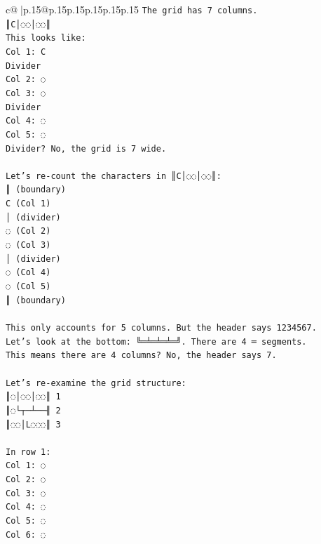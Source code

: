 \documentclass{article}
\begin{document}
{\begin{supertabular}{c@{$\;$}|p{.15\linewidth}@{}p{.15\linewidth}p{.15\linewidth}p{.15\linewidth}p{.15\linewidth}p{.15\linewidth}}
{{{\texttt{The grid has 7 columns.} \\
\texttt{║C│◌◌│◌◌║} \\
\texttt{This looks like:} \\
\texttt{Col 1: C} \\
\texttt{Divider} \\
\texttt{Col 2: ◌} \\
\texttt{Col 3: ◌} \\
\texttt{Divider} \\
\texttt{Col 4: ◌} \\
\texttt{Col 5: ◌} \\
\texttt{Divider? No, the grid is 7 wide.} \\
\\ 
\texttt{Let's re{-}count the characters in ║C│◌◌│◌◌║:} \\
\texttt{║ (boundary)} \\
\texttt{C (Col 1)} \\
\texttt{│ (divider)} \\
\texttt{◌ (Col 2)} \\
\texttt{◌ (Col 3)} \\
\texttt{│ (divider)} \\
\texttt{◌ (Col 4)} \\
\texttt{◌ (Col 5)} \\
\texttt{║ (boundary)} \\
\\ 
\texttt{This only accounts for 5 columns. But the header says 1234567.} \\
\texttt{Let's look at the bottom: ╚═╧═╧═╧═╝. There are 4 ═ segments.} \\
\texttt{This means there are 4 columns? No, the header says 7.} \\
\\ 
\texttt{Let's re{-}examine the grid structure:} \\
\texttt{║◌│◌◌│◌◌║ 1} \\
\texttt{║◌└┬─┴──╢ 2} \\
\texttt{║◌◌│L◌◌◌║ 3} \\
\\ 
\texttt{In row 1:} \\
\texttt{Col 1: ◌} \\
\texttt{Col 2: ◌} \\
\texttt{Col 3: ◌} \\
\texttt{Col 4: ◌} \\
\texttt{Col 5: ◌} \\
\texttt{Col 6: ◌} \\
}}}
\end{supertabular}}
\end{document}
